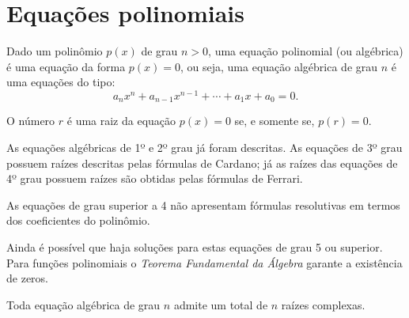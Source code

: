 


\section{Equações polinomiais}

Dado um polinômio $p(x)$ de grau $n>0$, uma equação polinomial (ou algébrica) é uma equação da forma $p(x)=0$, ou seja, uma equação algébrica de grau $n$ é uma equações do tipo:
\begin{equation*}
    a_n x^n+a_{n-1} x^{n-1}+\cdots+ a_1 x+a_0=0.
\end{equation*}

O número $r$ é uma raiz da equação $p(x)=0$ se, e somente se, $p(r)=0$.

\begin{obs}
As equações algébricas de 1º e 2º grau já foram descritas. As equações de 3º grau possuem raízes descritas pelas fórmulas de Cardano; já as raízes das equações de 4º grau possuem raízes são obtidas pelas fórmulas de Ferrari.

As equações de grau superior a 4 não apresentam fórmulas resolutivas em termos dos coeficientes do polinômio.
\end{obs}

Ainda é possível que haja soluções para estas equações de grau 5 ou superior. Para funções polinomiais o \emph{Teorema Fundamental da Álgebra} garante a existência de zeros.

\begin{teo}
Toda equação algébrica de grau $n$ admite um total de $n$ raízes complexas.
\end{teo}

